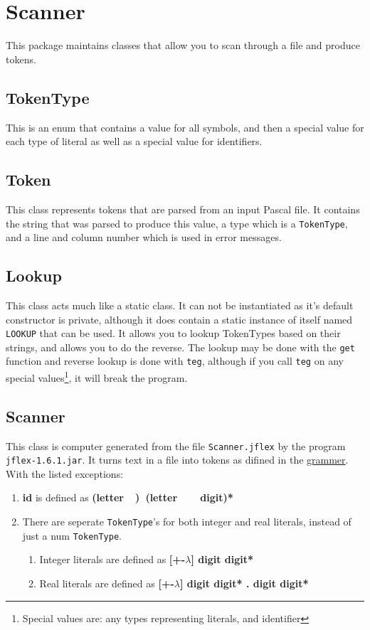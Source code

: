 \documentclass{article}
\def\grammer{grammer.pdf}
\begin{document}
\section{Scanner} \label{scanner}
This package maintains classes that allow you to scan through a file and produce tokens.

\subsection{TokenType}
This is an enum that contains a value for all symbols, and then a special value for each type of literal as well as a special value for identifiers.

\subsection{Token}
This class represents tokens that are parsed from an input Pascal file. It contains the string that was parsed to produce this value, a type which is a \texttt{TokenType}, and a line and column number which is used in error messages.

\subsection{Lookup}
This class acts much like a static class. It can not be instantiated as it's default constructor is private, although it does contain a static instance of itself named \texttt{LOOKUP} that can be used. It allows you to lookup TokenTypes based on their strings, and allows you to do the reverse. The lookup may be done with the \texttt{get} function and reverse lookup is done with \texttt{teg}, although if you call \texttt{teg} on any special values\footnote{Special values are: any types representing literals, and identifier}, it will break the program.

\subsection{Scanner}
This class is computer generated from the file \texttt{Scanner.jflex} by the program \texttt{jflex-1.6.1.jar}. It turns text in a file into tokens as difined in the \href{\grammer}{grammer}. With the listed exceptions:
\begin{enumerate}
\item \textbf{id} is defined as \textbf{(letter\ \textbar\ \textunderscore)\ (letter\ \textbar\ \textunderscore\ \textbar\ digit)*}
\item There are seperate \texttt{TokenType}'s for both integer and real literals, instead of just a num \texttt{TokenType}.
\begin{enumerate}
\item Integer literals are defined as \textbf{[+-$\lambda$] digit digit*}
\item Real literals are defined as \textbf{[+-$\lambda$] digit digit* . digit digit*}
\end{enumerate}
\end{enumerate}
\end{document}
